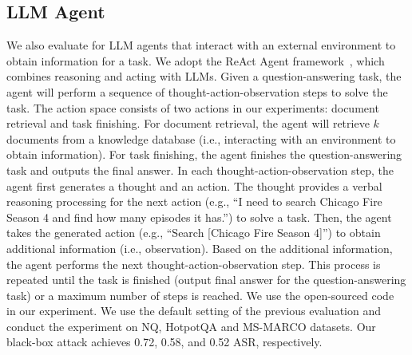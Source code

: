 \subsection{LLM Agent}
We also evaluate {\name} for LLM agents that interact with an external environment to obtain information for a task. We adopt the ReAct Agent framework~\cite{yao2022react}, which combines reasoning and acting with LLMs. Given a question-answering task, the agent will perform a sequence of thought-action-observation steps to solve the task. The action space consists of two actions in our experiments: document retrieval and task finishing. For document retrieval, the agent will retrieve $k$ documents from a knowledge database (i.e., interacting with an environment to obtain information). For task finishing, the agent finishes the question-answering task and outputs the final answer. In each thought-action-observation step, the agent first generates a thought and an action. The thought provides a verbal reasoning processing for the next action (e.g., ``I need to search Chicago Fire Season 4 and find how many episodes it has.'') to solve a task. Then, the agent takes the generated action (e.g., ``Search [Chicago Fire Season 4]'') to obtain additional information (i.e., observation). Based on the additional information, the agent performs the next thought-action-observation step. This process is repeated until the task is finished (output final answer for the question-answering task) or a maximum number of steps is reached. We use the open-sourced code~\cite{yao2022react} in our experiment.  We use the default setting of the previous evaluation and conduct the experiment on NQ, HotpotQA and MS-MARCO datasets. Our black-box attack achieves 0.72, 0.58, and 0.52 ASR, respectively.





